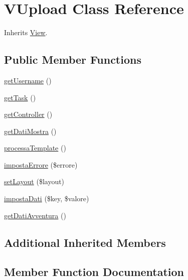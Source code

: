 \hypertarget{class_v_upload}{}\section{V\+Upload Class Reference}
\label{class_v_upload}


Inherits \mbox{\hyperlink{class_view}{View}}.

\subsection*{Public Member Functions}
\begin{DoxyCompactItemize}
\item 
\mbox{\hyperlink{class_v_upload_a81b37a3c9d639574e394f80c1138c75e}{get\+Username}} ()
\item 
\mbox{\hyperlink{class_v_upload_a13871c4434338f02d6f8d430fa0597f2}{get\+Task}} ()
\item 
\mbox{\hyperlink{class_v_upload_aa8b89e0bad51878addc1300cd3e95b5c}{get\+Controller}} ()
\item 
\mbox{\hyperlink{class_v_upload_a21c1b6e37828f68cadec73d5fe012eef}{get\+Dati\+Mostra}} ()
\item 
\mbox{\hyperlink{class_v_upload_a64bdc484fc7074989b4b2c0ebc63aec2}{processa\+Template}} ()
\item 
\mbox{\hyperlink{class_v_upload_acb9fd807e8b09b46b95fc55b65edeb36}{imposta\+Errore}} (\$errore)
\item 
\mbox{\hyperlink{class_v_upload_a702b3376618a26e6c02c05bae65c6b9e}{set\+Layout}} (\$layout)
\item 
\mbox{\hyperlink{class_v_upload_ab3c0dc76f35667b7a13404d03b7fdb36}{imposta\+Dati}} (\$key, \$valore)
\item 
\mbox{\hyperlink{class_v_upload_aff474932615e2b87b025f2ab9ba68598}{get\+Dati\+Avventura}} ()
\end{DoxyCompactItemize}
\subsection*{Additional Inherited Members}


\subsection{Member Function Documentation}
\mbox{\label{class_v_upload_aa8b89e0bad51878addc1300cd3e95b5c}} 

